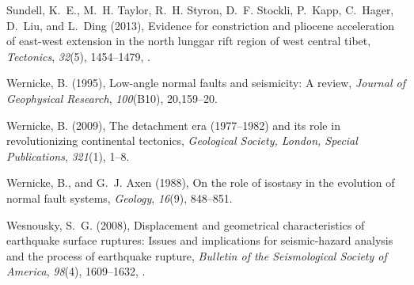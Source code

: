 \documentclass[twocolumn,grl]{AGUTeX}
\begin{document}
\begin{article}
\begin{thebibliography}{29}
Sundell, K.~E., M.~H. Taylor, R.~H. Styron, D.~F. Stockli, P.~Kapp, C.~Hager,
  D.~Liu, and L.~Ding (2013), Evidence for constriction and pliocene
  acceleration of east-west extension in the north lunggar rift region of west
  central tibet, \textit{Tectonics}, \textit{32}(5), 1454--1479,
  .

Wernicke, B. (1995), Low-angle normal faults and seismicity: A review,
  \textit{Journal of Geophysical Research}, \textit{100}(B10), 20,159--20.

Wernicke, B. (2009), The detachment era (1977--1982) and its role in
  revolutionizing continental tectonics, \textit{Geological Society, London,
  Special Publications}, \textit{321}(1), 1--8.

Wernicke, B., and G.~J. Axen (1988), On the role of isostasy in the evolution
  of normal fault systems, \textit{Geology}, \textit{16}(9), 848--851.

Wesnousky, S.~G. (2008), Displacement and geometrical characteristics of
  earthquake surface ruptures: Issues and implications for seismic-hazard
  analysis and the process of earthquake rupture, \textit{Bulletin of the
  Seismological Society of America}, \textit{98}(4), 1609--1632,
  .

\end{thebibliography}



\end{article}


%
%
\end{document}
